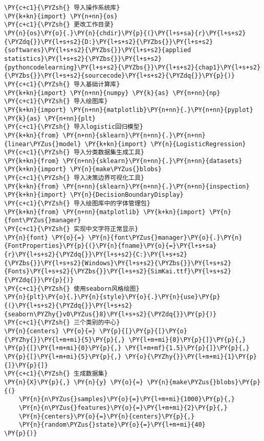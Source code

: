 \begin{Verbatim}[commandchars=\\\{\}]
\PY{c+c1}{\PYZsh{} 导入操作系统库}
\PY{k+kn}{import} \PY{n+nn}{os}
\PY{c+c1}{\PYZsh{} 更改工作目录}
\PY{n}{os}\PY{o}{.}\PY{n}{chdir}\PY{p}{(}\PY{l+s+sa}{r}\PY{l+s+s2}{\PYZdq{}}\PY{l+s+s2}{D:}\PY{l+s+s2}{\PYZbs{}}\PY{l+s+s2}{softwares}\PY{l+s+s2}{\PYZbs{}}\PY{l+s+s2}{applied statistics}\PY{l+s+s2}{\PYZbs{}}\PY{l+s+s2}{pythoncodelearning}\PY{l+s+s2}{\PYZbs{}}\PY{l+s+s2}{chap1}\PY{l+s+s2}{\PYZbs{}}\PY{l+s+s2}{sourcecode}\PY{l+s+s2}{\PYZdq{}}\PY{p}{)}
\PY{c+c1}{\PYZsh{} 导入基础计算库}
\PY{k+kn}{import} \PY{n+nn}{numpy} \PY{k}{as} \PY{n+nn}{np}
\PY{c+c1}{\PYZsh{} 导入绘图库}
\PY{k+kn}{import} \PY{n+nn}{matplotlib}\PY{n+nn}{.}\PY{n+nn}{pyplot} \PY{k}{as} \PY{n+nn}{plt}
\PY{c+c1}{\PYZsh{} 导入logistic回归模型}
\PY{k+kn}{from} \PY{n+nn}{sklearn}\PY{n+nn}{.}\PY{n+nn}{linear\PYZus{}model} \PY{k+kn}{import} \PY{n}{LogisticRegression}
\PY{c+c1}{\PYZsh{} 导入分类数据集生成工具}
\PY{k+kn}{from} \PY{n+nn}{sklearn}\PY{n+nn}{.}\PY{n+nn}{datasets} \PY{k+kn}{import} \PY{n}{make\PYZus{}blobs}
\PY{c+c1}{\PYZsh{} 导入决策边界可视化工具}
\PY{k+kn}{from} \PY{n+nn}{sklearn}\PY{n+nn}{.}\PY{n+nn}{inspection} \PY{k+kn}{import} \PY{n}{DecisionBoundaryDisplay}
\PY{c+c1}{\PYZsh{} 导入绘图库中的字体管理包}
\PY{k+kn}{from} \PY{n+nn}{matplotlib} \PY{k+kn}{import} \PY{n}{font\PYZus{}manager}
\PY{c+c1}{\PYZsh{} 实现中文字符正常显示}
\PY{n}{font} \PY{o}{=} \PY{n}{font\PYZus{}manager}\PY{o}{.}\PY{n}{FontProperties}\PY{p}{(}\PY{n}{fname}\PY{o}{=}\PY{l+s+sa}{r}\PY{l+s+s2}{\PYZdq{}}\PY{l+s+s2}{C:}\PY{l+s+s2}{\PYZbs{}}\PY{l+s+s2}{Windows}\PY{l+s+s2}{\PYZbs{}}\PY{l+s+s2}{Fonts}\PY{l+s+s2}{\PYZbs{}}\PY{l+s+s2}{SimKai.ttf}\PY{l+s+s2}{\PYZdq{}}\PY{p}{)}
\PY{c+c1}{\PYZsh{} 使用seaborn风格绘图}
\PY{n}{plt}\PY{o}{.}\PY{n}{style}\PY{o}{.}\PY{n}{use}\PY{p}{(}\PY{l+s+s2}{\PYZdq{}}\PY{l+s+s2}{seaborn\PYZhy{}v0\PYZus{}8}\PY{l+s+s2}{\PYZdq{}}\PY{p}{)}
\PY{c+c1}{\PYZsh{} 三个类别的中心}
\PY{n}{centers} \PY{o}{=} \PY{p}{[}\PY{p}{[}\PY{o}{\PYZhy{}}\PY{l+m+mi}{5}\PY{p}{,} \PY{l+m+mi}{0}\PY{p}{]}\PY{p}{,} \PY{p}{[}\PY{l+m+mi}{0}\PY{p}{,} \PY{l+m+mf}{1.5}\PY{p}{]}\PY{p}{,} \PY{p}{[}\PY{l+m+mi}{5}\PY{p}{,} \PY{o}{\PYZhy{}}\PY{l+m+mi}{1}\PY{p}{]}\PY{p}{]}
\PY{c+c1}{\PYZsh{} 生成数据集}
\PY{n}{X}\PY{p}{,} \PY{n}{y} \PY{o}{=} \PY{n}{make\PYZus{}blobs}\PY{p}{(}
    \PY{n}{n\PYZus{}samples}\PY{o}{=}\PY{l+m+mi}{1000}\PY{p}{,} 
    \PY{n}{n\PYZus{}features}\PY{o}{=}\PY{l+m+mi}{2}\PY{p}{,}
    \PY{n}{centers}\PY{o}{=}\PY{n}{centers}\PY{p}{,} 
    \PY{n}{random\PYZus{}state}\PY{o}{=}\PY{l+m+mi}{40}
\PY{p}{)}

\end{Verbatim}
